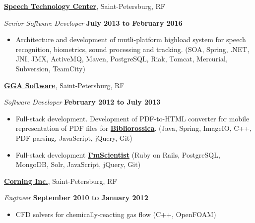 \documentclass[10pt]{article}
\newcommand{\halfblankline}{\quad\vspace{-0.5\baselineskip}\pagebreak[3]}
\begin{document}
\vspace{0.2in}
\halfblankline
\href{http://speechpro.com/}{\textbf{Speech Technology Center}}, Saint-Petersburg, RF
\begin{outerlist}
    \item[] \textit{Senior Software Developer}
            \hfill \textbf{July 2013 to February 2016}
            \begin{itemize}
               \item Architecture and development of mutli-platform highload system for speech recognition, biometrics, sound processing and tracking. (SOA, Spring, .NET, JNI, JMX, ActiveMQ, Maven, PostgreSQL, Riak, Tomcat, Mercurial, Subversion, TeamCity)
            \end{itemize}
\end{outerlist}
\vspace{0.2in}
\halfblankline
\href{http://www.ggasoftware.com}{\textbf{GGA Software}}, Saint-Petersburg, RF
\begin{outerlist}
    \item[] \textit{Software Developer}
            \hfill \textbf{February 2012 to July 2013}
            \begin{itemize}
               \item Full-stack development. Development of PDF-to-HTML converter for mobile representation of PDF files for \href{http://www.bibliorossica.com}{\textbf{Bibliorossica}}. (Java, Spring, ImageIO, C++, PDF parsing, JavaScript, jQuery, Git)
               \item Full-stack development \href{http://www.iamscientist.com}{\textbf{I'mScientist}} (Ruby on Rails,
               PostgreSQL, MongoDB, Solr, JavaScript, jQuery, Git)
            \end{itemize}

\end{outerlist}
\vspace{0.2in}
\halfblankline
\href{http://www.corning.com}{\textbf{Corning Inc.}}, Saint-Petersburg, RF
\begin{outerlist}
    \item[] \textit{Engineer}
            \hfill \textbf{September 2010 to January 2012}
            \begin{itemize}
                    \item CFD solvers for chemically-reacting gas flow (C++, OpenFOAM)
            \end{itemize}
\end{outerlist}
\end{document}

